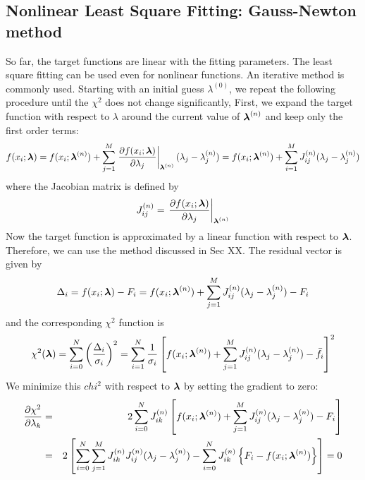 \subsection{Nonlinear Least Square Fitting: Gauss-Newton method}

So far, the target functions are linear with the fitting parameters.  The least square fitting can be used even for nonlinear functions.
An iterative method is commonly used.  Starting with an initial guess $\lambda^{(0)}$,
we repeat the following procedure until the $\chi^2$ does not change significantly,
First, we expand the target function with respect to $\lambda$ around the current value of $\boldsymbol{\lambda}^{(n)}$ and keep only the first order terms:
\begin{equation}
f(x_i; \boldsymbol{\lambda}) = f(x_i; \boldsymbol{\lambda}^{(n)}) + \sum_{j=1}^{M} \left . \frac{\partial f(x_i;\boldsymbol{\lambda})}{\partial \lambda_j} \right |_{\boldsymbol{\lambda}^{(n)}} (\lambda_j - \lambda_j^{(n)}) = f(x_i; \boldsymbol{\lambda}^{(n)}) + \sum_{i=1}^{M} J_{ij}^{(n)} (\lambda_j - \lambda_j^{(n)})
\end{equation}
where the Jacobian matrix is defined by
\begin{equation}
J_{ij}^{(n)} = \left . \frac{\partial f(x_i;\boldsymbol{\lambda})}{\partial \lambda_j} \right |_{\boldsymbol{\lambda}^{(n)}}
\end{equation}
Now the target function is approximated by a linear function with respect to $\boldsymbol{\lambda}$.  Therefore, we can use the method discussed in Sec XX.  The residual vector is given by 
 \begin{equation}
 \Delta_i  = f(x_i; \boldsymbol{\lambda}) -F_i = f(x_i;\boldsymbol{\lambda}^{(n)}) + \sum_{j=1}^{M} J_{ij}^{(n)} (\lambda_j - \lambda_j^{(n)}) - F_i
 \end{equation}
 and the corresponding $\chi^2$ function is
 \begin{equation}
 \chi^2(\boldsymbol{\lambda}) = \sum_{i=0}^N \left (\frac{\Delta_i}{\sigma_i} \right )^2
 = \sum_{i=1}^N \frac{1}{\sigma_i}\left [f(x_i;\boldsymbol{\lambda}^{(n)}) + \sum_{j=1}^{M} J_{ij}^{(n)} (\lambda_j - \lambda_j^{(n)}) - \bar{f}_i \right ]^2
 \end{equation}
We minimize this $chi^2$ with respect to $\boldsymbol{\lambda}$ by setting the gradient to zero:
 \begin{eqnarray}
\frac{\partial \chi^2}{\partial \lambda_k} &=& 2
 \sum_{i=0}^N  J_{ik}^{(n)} \left [f(x_i;\boldsymbol{\lambda}^{(n)}) + \sum_{j=1}^{M} J_{ij}^{(n)} (\lambda_j - \lambda_j^{(n)}) - F_i \right ] \nonumber\\
 &=& 2 \left [ \sum_{i=0}^N \sum_{j=1}^M  J_{ik}^{(n)}  J_{ij}^{(n)} (\lambda_j - \lambda_j^{(n)}) - 
  \sum_{i=0}^N  J_{ik}^{(n)} \left \{ F_i-f(x_i;\boldsymbol{\lambda}^{(n)}) \right \} \right ]
 =0 
 \end{eqnarray}
 

